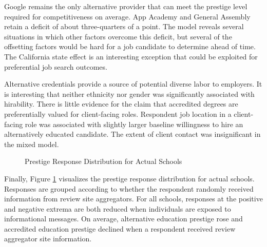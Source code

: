 \documentclass[review]{elsarticle}
\begin{document}
Google remains the only alternative provider that can meet the prestige level required
for competitiveness on average.
App Academy and General Assembly retain a deficit of about three-quarters of a point.
The model reveals several situations in which other factors overcome this deficit,
but several of the offsetting factors would be hard for a job candidate to determine ahead of time.
The California state effect is an interesting exception that could be exploited
for preferential job search outcomes.

Alternative credentials provide a source of potential diverse labor to employers.
It is interesting that neither ethnicity nor gender was significantly associated with hirability.
There is little evidence for the claim that accredited degrees are preferentially valued for client-facing roles.
Respondent job location in a client-facing role was associated with slightly larger
baseline willingness to hire an alternatively educated candidate.
The extent of client contact was insignificant in the mixed model.

\begin{figure}[h!]
    \centering
    \caption{Prestige Response Distribution for Actual Schools}
    \label{fig:var_results}
\end{figure}

Finally, Figure \ref{fig:var_results} visualizes the prestige response distribution
for actual schools.
Responses are grouped according to whether the respondent randomly received information
from review site aggregators.
For all schools, responses at the positive and negative extrema are both reduced
when individuals are exposed to informational messages.
On average, alternative education prestige rose and accredited education prestige declined
when a respondent received review aggregator site information.
\end{document}
